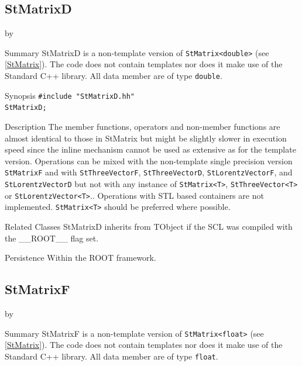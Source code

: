 \documentclass[twoside]{article}
\newcommand{\name}[1]{\textsf{#1}}%
\newcommand{\entrylabel}[1]{\mbox{\textbf{{#1}}}\hfil}%
\newenvironment{entry}
{\begin{list}{}%
    {\renewcommand{\makelabel}{\entrylabel}%
     \setlength{\labelwidth}{90pt}%
     \setlength{\leftmargin}{\labelwidth}
     \advance\leftmargin by \labelsep%
      }%
    }%
  {\end{list}}
\newcommand{\Entrylabel}[1]%
{\raisebox{0pt}[1ex][0pt]{\makebox[\labelwidth][l]%
    {\parbox[t]{\labelwidth}{\hspace{0pt}\textbf{{#1}}}}}}
\newenvironment{Entry}%
{\renewcommand{\entrylabel}{\Entrylabel}\begin{entry}}%
  {\end{entry}}
\begin{document}
\begin{description}
\subsection{StMatrixD } \label{StMatrixD}
\begin{Entry}
\item[Summary]
    StMatrixD is a non-template version of \verb+StMatrix<double>+
    (see \ref{StMatrix}). The code does not contain templates nor
    does it make use of the Standard C++ library. All data member are of
    type \texttt{double}.
    
\item[Synopsis]
    \verb+#include "StMatrixD.hh"+ \\
    \verb+StMatrixD;+
    
    
\item[Description]       
    The member functions, operators and non-member functions are almost identical
    to those in StMatrix but might be slightly slower in execution speed
    since the inline mechanism cannot be used as extensive as for the template
    version. Operations can be mixed with the non-template single precision version
    \texttt{StMatrixF} and with \texttt{StThreeVectorF}, \texttt{StThreeVectorD},
    \texttt{StLorentzVectorF}, and \texttt{StLorentzVectorD}
    but not with any instance of \verb+StMatrix<T>+, \verb+StThreeVector<T>+ or
    \verb+StLorentzVector<T>+..
    Operations with STL based containers are not implemented.
    \verb+StMatrix<T>+ should be preferred where possible.

\item[Related Classes]
    StMatrixD inherits from TObject 
    if the SCL was compiled with the \name{\_\_ROOT\_\_} flag set.

\item[Persistence]
    Within the ROOT framework.


\end{Entry}

%
%
\subsection{StMatrixF } \label{StMatrixF}
\begin{Entry}
\item[Summary]
    StMatrixF is a non-template version of \verb+StMatrix<float>+
    (see \ref{StMatrix}). The code does not contain templates nor
    does it make use of the Standard C++ library. All data member are of
    type \texttt{float}.
    

\end{Entry}
\end{description}
\end{document}
